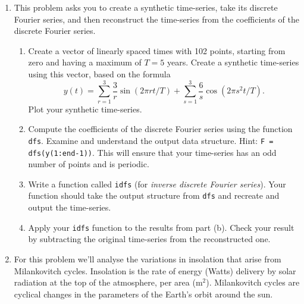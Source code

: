 \documentclass[12pt,twoside,a4paper]{article}
\begin{document}
\begin{enumerate}
\item This problem asks you to create a synthetic time-series, take
  its discrete Fourier series, and then reconstruct the time-series
  from the coefficients of the discrete Fourier series.
  \begin{enumerate}
  \item Create a vector of linearly spaced times with 102 points,
    starting from zero and having a maximum of $T=5$ years. Create a
    synthetic time-series using this vector, based on the formula
    \begin{displaymath}
      y(t) = \sum_{r=1}^3 \frac{3}{r}\sin(2\pi r t/T) +
      \sum_{s=1}^3\frac{6}{s}\cos(2\pi s^2 t/T).
    \end{displaymath}
    Plot your synthetic time-series.
  \item Compute the coefficients of the discrete Fourier series using
    the function \texttt{dfs}. Examine and understand the output data
    structure. Hint: \texttt{F = dfs(y(1:end-1))}. This will ensure
    that your time-series has an odd number of points and is periodic.
  \item Write a \Mlab function called \texttt{idfs} (for
    \textit{inverse discrete Fourier series}).  Your function should
    take the output structure from \texttt{dfs} and recreate and
    output the time-series.
  \item Apply your \texttt{idfs} function to the results from part
    (b). Check your result by subtracting the original time-series
    from the reconstructed one.
  \end{enumerate}
\item For this problem we'll analyse the variations in insolation that
  arise from Milankovitch cycles. Insolation is the rate of energy
  (Watts) delivery by solar radiation at the top of the atmosphere,
  per area (m$^2$).  Milankovitch cycles are cyclical changes in the
  parameters of the Earth's orbit around the sun.


\end{enumerate}
\end{document}
